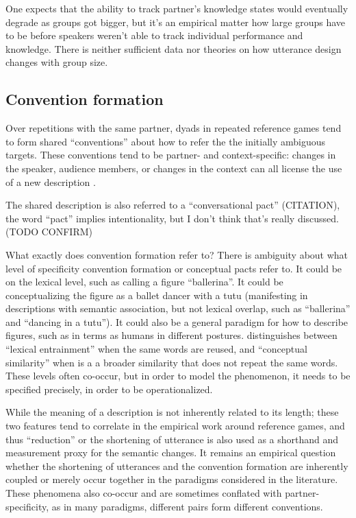 \documentclass[]{article}
\begin{document}
One expects that the ability to track partner's knowledge states would eventually degrade as groups got bigger, but it's an empirical matter how large groups have to be before speakers weren't able to track individual performance and knowledge. There is neither sufficient data nor theories on how utterance design changes with group size. 


\subsection{Convention formation}
Over repetitions with the same partner, dyads in repeated reference games tend to form shared ``conventions'' about how to refer the the initially ambiguous targets. These conventions tend to be partner- and context-specific: changes in the speaker, audience members, or changes in the context can all license the use of a new description \cite{metzing2003a, ibarra2016, yoon2014}.

The shared description is also referred to a ``conversational pact'' (CITATION), the word ``pact'' implies intentionality, but I don't think that's really discussed. (TODO CONFIRM)

What exactly does convention formation refer to? There is ambiguity about what level of specificity convention formation or conceptual pacts refer to. 
It could be on the lexical level, such as calling a figure ``ballerina''. It could be conceptualizing the figure as a ballet dancer with a tutu (manifesting in descriptions with semantic association, but not lexical overlap, such as ``ballerina'' and ``dancing in a tutu''). It could also be a general paradigm for how to describe figures, such as in terms as humans in different postures.  \cite{horton2002a} distinguishes between ``lexical entrainment'' when the same words are reused, and ``conceptual similarity'' when is a a broader similarity that does not repeat the same words. These levels often co-occur, but in order to model the phenomenon, it needs to be specified precisely, in order to be operationalized. 

While the meaning of a description is not inherently related to its length; these two features tend to correlate in the empirical work around reference games, and thus ``reduction'' or the shortening of utterance is also used as a shorthand and measurement proxy for the semantic changes. It remains an empirical question whether the shortening of utterances and the convention formation are inherently coupled or merely occur together in the paradigms considered in the literature. These phenomena also co-occur and are sometimes conflated with partner-specificity, as in many paradigms, different pairs form different conventions. 
\end{document}
